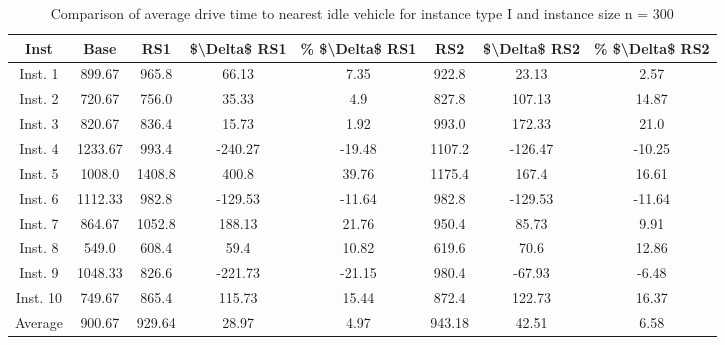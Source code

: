 \begin{table}[H]
\centering
\begin{tabular}{cccccccc}
  \hline
  \textbf{Inst} & \textbf{Base} & \textbf{RS1} & \textbf{\$\textbackslash{}Delta\$  RS1} & \textbf{\% \$\textbackslash{}Delta\$  RS1} & \textbf{RS2} & \textbf{\$\textbackslash{}Delta\$  RS2} & \textbf{\% \$\textbackslash{}Delta\$  RS2} \\\hline
  Inst. 1 & 899.67 & 965.8 & 66.13 & 7.35 & 922.8 & 23.13 & 2.57 \\
  Inst. 2 & 720.67 & 756.0 & 35.33 & 4.9 & 827.8 & 107.13 & 14.87 \\
  Inst. 3 & 820.67 & 836.4 & 15.73 & 1.92 & 993.0 & 172.33 & 21.0 \\
  Inst. 4 & 1233.67 & 993.4 & -240.27 & -19.48 & 1107.2 & -126.47 & -10.25 \\
  Inst. 5 & 1008.0 & 1408.8 & 400.8 & 39.76 & 1175.4 & 167.4 & 16.61 \\
  Inst. 6 & 1112.33 & 982.8 & -129.53 & -11.64 & 982.8 & -129.53 & -11.64 \\
  Inst. 7 & 864.67 & 1052.8 & 188.13 & 21.76 & 950.4 & 85.73 & 9.91 \\
  Inst. 8 & 549.0 & 608.4 & 59.4 & 10.82 & 619.6 & 70.6 & 12.86 \\
  Inst. 9 & 1048.33 & 826.6 & -221.73 & -21.15 & 980.4 & -67.93 & -6.48 \\
  Inst. 10 & 749.67 & 865.4 & 115.73 & 15.44 & 872.4 & 122.73 & 16.37 \\
  Average & 900.67 & 929.64 & 28.97 & 4.97 & 943.18 & 42.51 & 6.58 \\\hline
\end{tabular}
\caption{Comparison of average drive time to nearest idle vehicle for instance type I and instance size n = 300}
\label{tab:wait:resrelocation-nearest-drive-time-comparison_I_300}
\end{table}
